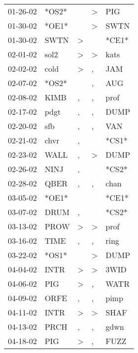 \begin{supertabular}{lllll}
 01-26-02 &  *OS2* &                  &     \textgreater &    PIG \\
 01-30-02 &  *OE1* &                  &     \textgreater &   SWTN \\
 01-30-02 &   SWTN &     \textgreater &                  &  *CE1* \\
 02-01-02 &   sol2 &     \textgreater &     \textgreater &   kats \\
 02-02-02 &   cold &     \textgreater &                , &    JAM \\
 02-07-02 &  *OS2* &                  &                , &    AUG \\
 02-08-02 &   KIMB &                , &                , &   prof \\
 02-17-02 &   pdgt &                , &                , &   DUMP \\
 02-20-02 &    sfb &                , &                , &    VAN \\
 02-21-02 &   chvr &                , &                  &  *CS1* \\
 02-23-02 &   WALL &                , &     \textgreater &   DUMP \\
 02-26-02 &   NINJ &                , &                  &  *CS2* \\
 02-28-02 &   QBER &                , &                , &   chan \\
 03-05-02 &  *OE1* &                  &                  &  *CE1* \\
 03-07-02 &   DRUM &                , &                  &  *CS2* \\
 03-13-02 &   PROW &     \textgreater &     \textgreater &   prof \\
 03-16-02 &   TIME &                , &                , &   ring \\
 03-22-02 &  *OS1* &                  &     \textgreater &   DUMP \\
 04-04-02 &   INTR &     \textgreater &     \textgreater &   3WID \\
 04-06-02 &    PIG &     \textgreater &                , &   WATR \\
 04-09-02 &   ORFE &                , &                , &   pimp \\
 04-11-02 &   INTR &     \textgreater &     \textgreater &   SHAF \\
 04-13-02 &   PRCH &                , &                , &   gdwn \\
 04-18-02 &    PIG &     \textgreater &                , &   FUZZ \\

\end{supertabular}
